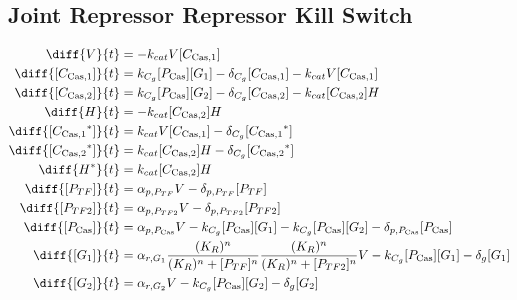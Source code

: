 \subsection{Joint Repressor Repressor Kill Switch}
\label{s:Joint_Repressor_Repressor_Kill_Switch}

\begin{align}
\diff{\vectorGen{}}{t} & = - \casCutRate{{}}\vectorGen{}\conc{\cplx{\cas}{1}}\\
\diff{\conc{\cplx{\cas}{1}}}{t} & =  \gRnaBind{}\conc{\proSp{\cas{}}}\conc{\gRna{1}} - \casCompDegradeRate{}\conc{\cplx{\cas}{1}} - \casCutRate{{}}\vectorGen{}\conc{\cplx{\cas}{1}}\\
\diff{\conc{\cplx{\cas}{2}}}{t} & =  \gRnaBind{}\conc{\proSp{\cas{}}}\conc{\gRna{2}} - \casCompDegradeRate{}\conc{\cplx{\cas}{2}} - \casCutRate{{}}\conc{\cplx{\cas}{2}}\hostGen{}\\
\diff{\hostGen{}}{t} & = - \casCutRate{{}}\conc{\cplx{\cas}{2}}\hostGen{}\\
\diff{\conc{\bound{\cplx{\cas}{1}}}}{t} & =  \casCutRate{{}}\vectorGen{}\conc{\cplx{\cas}{1}} - \casCompDegradeRate{}\conc{\bound{\cplx{\cas}{1}}}\\
\diff{\conc{\bound{\cplx{\cas}{2}}}}{t} & =  \casCutRate{{}}\conc{\cplx{\cas}{2}}\hostGen{} - \casCompDegradeRate{}\conc{\bound{\cplx{\cas}{2}}}\\
\diff{\edited{\hostGen{}}}{t} & =  \casCutRate{{}}\conc{\cplx{\cas}{2}}\hostGen{}\\
\diff{\conc{\proSp{TF}}}{t} & =  \txtlRate{\proSp{TF}}\vectorGen{} - \proDegradeRate{\proSp{TF}}\conc{\proSp{TF}}\\
\diff{\conc{\proSp{TF2}}}{t} & =  \txtlRate{\proSp{TF2}}\vectorGen{} - \proDegradeRate{\proSp{TF2}}\conc{\proSp{TF2}}\\
\diff{\conc{\proSp{\cas{}}}}{t} & =  \txtlRate{\proSp{\cas{}}}\vectorGen{} - \gRnaBind{}\conc{\proSp{\cas{}}}\conc{\gRna{1}} - \gRnaBind{}\conc{\proSp{\cas{}}}\conc{\gRna{2}} - \proDegradeRate{\proSp{\cas{}}}\conc{\proSp{\cas{}}}\\
\diff{\conc{\gRna{1}}}{t} & =  \txRate{\gRna{1}}\frac{(K_R)^n}{(K_R)^n + \conc{\proSp{TF}}^n}\frac{(K_R)^n}{(K_R)^n + \conc{\proSp{TF2}}^n}\vectorGen{} - \gRnaBind{}\conc{\proSp{\cas{}}}\conc{\gRna{1}} - \rnaDegradeRate{}\conc{\gRna{1}}\\
\diff{\conc{\gRna{2}}}{t} & =  \txRate{\gRna{2}}\vectorGen{} - \gRnaBind{}\conc{\proSp{\cas{}}}\conc{\gRna{2}} - \rnaDegradeRate{}\conc{\gRna{2}}
\end{align}

